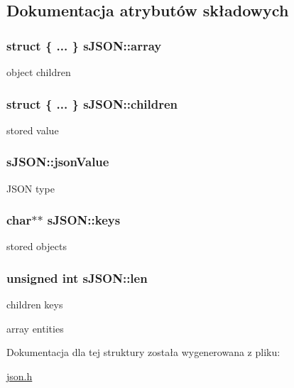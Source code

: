 \subsection{Dokumentacja atrybutów składowych}
\subsubsection[{\texorpdfstring{array}{array}}]{\setlength{\rightskip}{0pt plus 5cm}struct \{ ... \}   s\+J\+S\+O\+N\+::array}\hypertarget{structsJSON_a4c8ba3fc09489bdb99aca27ef7fff535}{}\label{structsJSON_a4c8ba3fc09489bdb99aca27ef7fff535}
object children 
\subsubsection[{\texorpdfstring{children}{children}}]{\setlength{\rightskip}{0pt plus 5cm}struct \{ ... \}   s\+J\+S\+O\+N\+::children}\hypertarget{structsJSON_a3c49fa17c184d6be197b183d759c4585}{}\label{structsJSON_a3c49fa17c184d6be197b183d759c4585}
stored value 
\subsubsection[{\texorpdfstring{json\+Value}{jsonValue}}]{ s\+J\+S\+O\+N\+::json\+Value}\hypertarget{structsJSON_ae4d7953fe5e0369930ba3ddd91d64743}{}\label{structsJSON_ae4d7953fe5e0369930ba3ddd91d64743}
J\+S\+ON type 
\subsubsection[{\texorpdfstring{keys}{keys}}]{\setlength{\rightskip}{0pt plus 5cm}char$\ast$$\ast$ s\+J\+S\+O\+N\+::keys}\hypertarget{structsJSON_a3db035c9589ee45acad7efa117cbf1a7}{}\label{structsJSON_a3db035c9589ee45acad7efa117cbf1a7}
stored objects 
\subsubsection[{\texorpdfstring{len}{len}}]{\setlength{\rightskip}{0pt plus 5cm}unsigned int s\+J\+S\+O\+N\+::len}\hypertarget{structsJSON_a0180ac53bd69e91ecfa80ace5a1c3f91}{}\label{structsJSON_a0180ac53bd69e91ecfa80ace5a1c3f91}
children keys

array entities 

Dokumentacja dla tej struktury została wygenerowana z pliku\+:\begin{DoxyCompactItemize}
\item 
\hyperlink{json_8h}{json.\+h}\end{DoxyCompactItemize}
